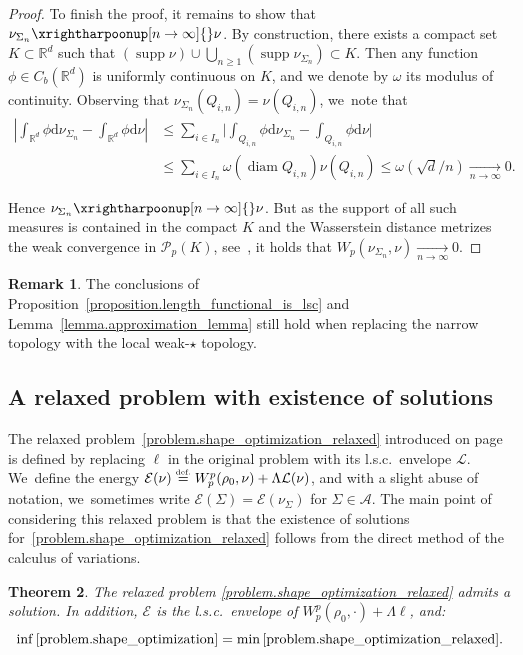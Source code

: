 \documentclass[JEP,XML,SOM,Unicode,NoFloatCountersInSection,published]{cedram}
\newtheorem{theorem}{Theorem}[section]
\theoremstyle{definition}
\newtheorem{remark}[theorem]{Remark}
\newcommand{\eqdef}{\ensuremath{\stackrel{\mbox{\upshape\tiny def.}}{=}}}
\newcommand\A{\mathcal{A}}
\newcommand\E{\mathcal{E}}
\newcommand{\RR}{\mathbb{R}}
\DeclareMathOperator{\diam}{diam}
\DeclareMathOperator{\supp}{supp}
\newcommand\dd{\mathrm{d}}
\begin{document}
\begin{proof}
To finish the proof, it remains to show that $\nu_{\Sigma_n} \xrightharpoonup[n \to \infty]{} \nu$. By construction, there exists a compact set $K \subset \RR^d$ such that $(\supp \nu)\cup \bigcup_{n\geq 1} \left(\supp \nu_{\Sigma_n}\right) \subset K$. Then any function $\phi \in C_b(\RR^d)$ is uniformly continuous on $K$, and we denote by $\omega$ its modulus of continuity.
Observing that $\nu_{\Sigma_n}(Q_{i,n}) = \nu(Q_{i,n})$, we~note that
\begin{align*}
\left|
\int_{\RR^d}\phi\dd\nu_{\Sigma_n}
-
\int_{\RR^d}\phi\dd\nu
\right|
&\le
\sum_{i \in I_n}
\biggl|
\int_{Q_{i,n}}\phi\dd\nu_{\Sigma_n} - \int_{Q_{i,n}}\phi\dd\nu
\biggr|\\
&\le
\sum_{i \in I_n} \omega(\diam Q_{i,n})\nu(Q_{i,n})
\le
\omega(\sqrt{d}/{n}) \xrightarrow[n \to \infty]{} 0.
\end{align*}

Hence $\nu_{\Sigma_n} \xrightharpoonup[n \to \infty]{} \nu$. But as the support of all such measures is contained in the compact $K$ and the Wasserstein distance metrizes the weak convergence in $\mathcal{P}_p(K)$, see~\cite[Th.\,5.10]{santambrogio2015optimal}, it holds that $W_p(\nu_{\Sigma_n}, \nu) \xrightarrow[n \to \infty]{} 0$.
\end{proof}

\begin{remark}
The conclusions of Proposition~\ref{proposition.length_functional_is_lsc} and Lemma~\ref{lemma.approximation_lemma} still hold when replacing the narrow topology with the local weak-$\star$ topology.
\end{remark}

\subsection{A relaxed problem with existence of solutions}
The relaxed problem~\eqref{problem.shape_optimization_relaxed} introduced on page~\pageref{problem.shape_optimization_relaxed} is defined by replacing $\ell$ in the original problem with its l.s.c.~envelope $\mathcal{L}$. We~define the energy $\E(\nu) \eqdef W_p^p(\rho_0, \nu) + \Lambda \mathcal{L}(\nu)$, and with a slight abuse of notation, we~sometimes write $\mathcal{E}(\Sigma) = \mathcal{E}(\nu_{\Sigma})$ for $\Sigma \in \A$.
The main point of considering this relaxed problem is that the existence of solutions for~\eqref{problem.shape_optimization_relaxed} follows from the direct method of the calculus of variations.

\begin{theorem}\label{theorem.existence_relaxed_problem}
The relaxed problem \eqref{problem.shape_optimization_relaxed} admits a solution. In addition, $\mathcal{E}$ is the l.s.c.~envelope of $W_p^p(\rho_0, \cdot) + \Lambda \ell$, and:
\[
\inf \eqref{problem.shape_optimization} =
\min \eqref{problem.shape_optimization_relaxed}.
\]
\end{theorem}
\end{document}
